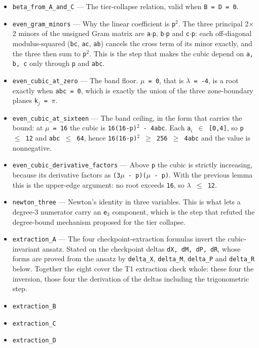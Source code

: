 \documentclass[11pt]{article}
\theoremstyle{plain}
\theoremstyle{definition}
\theoremstyle{remark}
\begin{document}
\begin{itemize}
\item \texttt{beta\_from\_A\_and\_C} --- The tier-collapse relation, valid when \texttt{B = D = 0}.
\item \texttt{even\_gram\_minors} --- Why the linear coefficient is \texttt{p$^2$}. The three principal 2$\times$2 minors of the unsigned Gram matrix are \texttt{a$\cdot$p}, \texttt{b$\cdot$p} and \texttt{c$\cdot$p}: each off-diagonal modulus-squared (\texttt{bc}, \texttt{ac}, \texttt{ab}) cancels the cross term of its minor exactly, and the three then sum to \texttt{p$^2$}. This is the step that makes the cubic depend on \texttt{a, b, c} only through \texttt{p} and \texttt{abc}.
\item \texttt{even\_cubic\_at\_zero} --- The band floor. \texttt{$\mu$ = 0}, that is \texttt{$\lambda$ = -4}, is a root exactly when \texttt{abc = 0}, which is exactly the union of the three zone-boundary planes \texttt{k$_j$ = $\pi$}.
\item \texttt{even\_cubic\_at\_sixteen} --- The band ceiling, in the form that carries the bound: at \texttt{$\mu$ = 16} the cubic is \texttt{16(16-p)$^2$ - 4abc}. Each \texttt{a$_i$ $\in$ [0,4]}, so \texttt{p $\le$ 12} and \texttt{abc $\le$ 64}, hence \texttt{16(16-p)$^2$ $\ge$ 256 $\ge$ 4abc} and the value is nonnegative.
\item \texttt{even\_cubic\_derivative\_factors} --- Above \texttt{p} the cubic is strictly increasing, because its derivative factors as \texttt{(3$\mu$ - p)($\mu$ - p)}. With the previous lemma this is the upper-edge argument: no root exceeds \texttt{16}, so \texttt{$\lambda$ $\le$ 12}.
\item \texttt{newton\_three} --- Newton's identity in three variables. This is what lets a degree-3 numerator carry an \texttt{e$_3$} component, which is the step that refuted the degree-bound mechanism proposed for the tier collapse.
\item \texttt{extraction\_A} --- The four checkpoint-extraction formulas invert the cubic-invariant ansatz. Stated on the checkpoint deltas \texttt{dX, dM, dP, dR}, whose forms are proved from the ansatz by \texttt{delta\_X}, \texttt{delta\_M}, \texttt{delta\_P} and \texttt{delta\_R} below. Together the eight cover the T1 extraction check whole: these four the inversion, those four the derivation of the deltas including the trigonometric step.
\item \texttt{extraction\_B}
\item \texttt{extraction\_C}
\item \texttt{extraction\_D}

\end{itemize}
\end{document}
